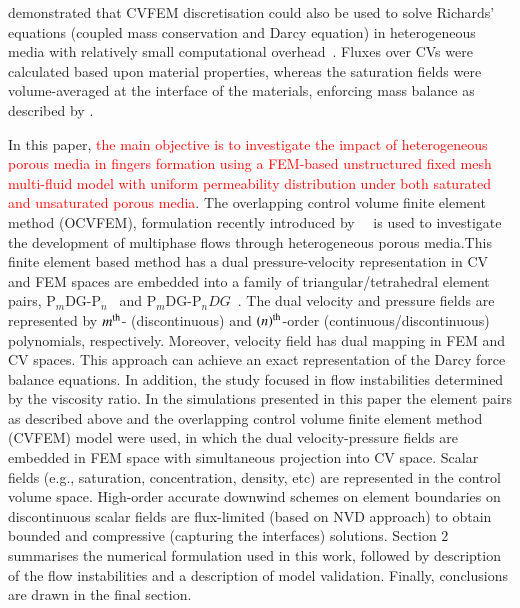 \documentclass[preprint,authoryear,12pt]{elsarticle}
\newcommand{\JGnote}[1]{\fbox{\parbox{\textwidth}{ \color{red} JG Note $\Rightarrow$ #1}}}
\begin{document}
{\citet{cumming_2011} demonstrated that CVFEM discretisation could also be used to solve Richards' equations (coupled mass conservation and Darcy equation) in heterogeneous media with relatively small computational overhead~\citep[compared with traditional coupled velocity-pressure based formulations, see also][]{cumming_phd2012}. Fluxes over CVs were calculated based upon material properties, whereas the saturation fields were volume-averaged at the interface of the materials, enforcing mass balance as described by \citet{kirkland_1992}.


In this paper, \textcolor{red}{the main objective is to investigate the impact of heterogeneous porous media in fingers formation using a FEM-based unstructured fixed mesh multi-fluid model with uniform permeability distribution under both saturated and unsaturated porous media}. The overlapping control volume finite element method (OCVFEM), formulation recently introduced by~\citet{jackson_2013}~\citep[see also][]{gomes_2013,pavlidis_2013} is used to investigate the development of multiphase flows through heterogeneous porous media.This finite element based method has a dual pressure-velocity representation in CV and FEM spaces  are embedded into a family of triangular/tetrahedral element pairs, P$_{m}$DG-P$_{n}$~\citep{cotter_2009b} and P$_{m}$DG-P$_{n}DG$~\citep{xie_2014}. The dual velocity and pressure fields are represented by $m^{\rm th}$- (discontinuous) and $({n})^{\rm th}$-order (continuous/discontinuous) polynomials, respectively.
Moreover, velocity field has dual mapping in FEM and CV spaces. This approach can achieve an exact representation of the Darcy force balance equations. 
In addition, the study focused in flow instabilities determined by the viscosity ratio. In the simulations presented in this paper the element pairs as described above and the overlapping control volume finite element method (CVFEM) model were used, in which the dual velocity-pressure fields are embedded in FEM space with simultaneous projection into CV space. Scalar fields (e.g., saturation, concentration, density, etc) are represented in the control volume space. High-order accurate downwind schemes on element boundaries on discontinuous scalar fields are flux-limited (based on NVD approach) to obtain bounded and compressive (capturing the interfaces) solutions. Section $2$ summarises the numerical formulation used in this work, followed by description of the flow instabilities  and a description of model validation. Finally, conclusions are drawn in the final section. 
}
\end{document}
